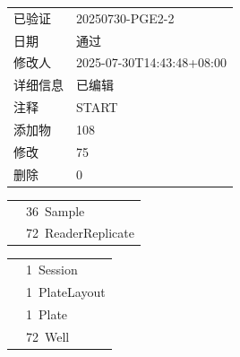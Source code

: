 \documentclass[UTF8,10pt,a4paper,fontset=fandol]{ctexart}
\newcommand{\fieldvalue}[1]{#1}
\begin{document}
\begin{center}
\begin{center}
\begin{tabular}{@{}ll@{}}
已验证 &
\fieldvalue{20250730-PGE2-2}\\
日期 &
\fieldvalue{通过}\\
修改人 &
\fieldvalue{2025-07-30T14:43:48+08:00}\\
详细信息 &
\fieldvalue{已编辑}\\
注释 &
\fieldvalue{START}\\
添加物 &
\fieldvalue{108}\\
修改 &
\fieldvalue{75}\\
删除 &
\fieldvalue{0}\\
\end{tabular}

\medskip


\begin{tabular}{@{}ll@{}}
&
\fieldvalue{36\ Sample}\\
&
\fieldvalue{72\ ReaderReplicate}\\
\end{tabular}

\medskip


\begin{tabular}{@{}ll@{}}
&
\fieldvalue{1\ Session}\\
&
\fieldvalue{1\ PlateLayout}\\
&
\fieldvalue{1\ Plate}\\
&
\fieldvalue{72\ Well}\\
\end{tabular}

\medskip



\end{center}
\end{center}
\end{document}
